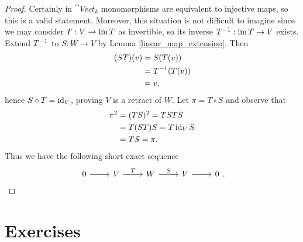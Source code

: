 \documentclass[12pt]{article}
\theoremstyle{definition}
\theoremstyle{plain}
\numberwithin{equation}{section}
\theoremstyle{definition}
\begin{document}
\begin{proof}
Certainly in $ \cat{Vect}_k $ monomorphisms are equivalent to injective maps, so this is a valid statement. Moreover, this situation is not difficult to imagine since 
we may consider $ T : V \to \operatorname{im} T $ as invertible, so its inverse $ T^{-1} : \operatorname{im} T \to V $ exists. Extend $ T^{-1} $ to $ S : W \to V$ by Lemma \ref{linear_map_extension}. Then 
\begin{align*}
	(ST)(v) &= S(T(v))\\
	&= T^{-1}(T(v))\\
	&= v,
\end{align*}
hence $ S\circ T = \operatorname{id}_V $, proving $ V $ is a retract of $ W $. Let $ \pi = T \circ S $ and observe that 
\begin{align*}
	 \pi^2 &= (TS)^2 = TS TS\\
	 &= T (ST) S = T \operatorname{id}_V S\\
	 &= TS = \pi.
\end{align*}
Thus we have the following short exact sequence
\[\begin{tikzcd}
	0 \arrow[r, ""] & V \arrow[r, "T"] & W \arrow[r, "S"] & V \arrow[r, ""] & 0
\end{tikzcd}.\]
\end{proof}

\section*{Exercises}
\end{document}
